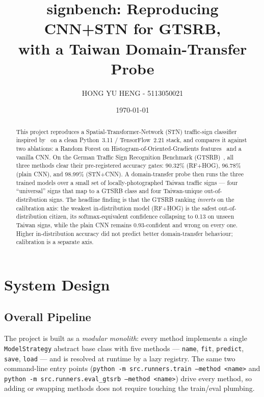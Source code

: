 \documentclass[11pt,a4paper]{article}
\title{%
  signbench: Reproducing CNN+STN for GTSRB,\\
  with a Taiwan Domain-Transfer Probe
}
\author{HONG YU HENG - 5113050021}
\date{\today}
\begin{document}
\maketitle

\begin{abstract}
This project reproduces a Spatial-Transformer-Network (STN) traffic-sign classifier inspired by~\cite{jaderberg2015stn,hello2allgtsrb} on a clean Python~3.11 / TensorFlow~2.21 stack, and compares it against two ablations: a Random Forest on Histogram-of-Oriented-Gradients features~\cite{dalal2005hog,zaklouta2011realtime} and a vanilla CNN. On the German Traffic Sign Recognition Benchmark (GTSRB)~\cite{stallkamp2012gtsrb}, all three methods clear their pre-registered accuracy gates: 90.32\% (RF+HOG), 96.78\% (plain CNN), and 98.99\% (STN+CNN). A domain-transfer probe then runs the three trained models over a small set of locally-photographed Taiwan traffic signs — four ``universal'' signs that map to a GTSRB class and four Taiwan-unique out-of-distribution signs. The headline finding is that the GTSRB ranking \emph{inverts} on the calibration axis: the weakest in-distribution model (RF+HOG) is the safest out-of-distribution citizen, its softmax-equivalent confidence collapsing to 0.13 on unseen Taiwan signs, while the plain CNN remains 0.93-confident and wrong on every one. Higher in-distribution accuracy did not predict better domain-transfer behaviour; calibration is a separate axis.
\end{abstract}

\section{System Design}
\label{sec:system-design}

\subsection{Overall Pipeline}
The project is built as a \emph{modular monolith}: every method implements a single \texttt{ModelStrategy} abstract base class with five methods — \texttt{name}, \texttt{fit}, \texttt{predict}, \texttt{save}, \texttt{load} — and is resolved at runtime by a lazy registry. The same two command-line entry points (\texttt{python -m src.runners.train --method <name>} and \texttt{python -m src.runners.eval\_gtsrb --method <name>}) drive every method, so adding or swapping methods does not require touching the train/eval plumbing.
\end{document}
